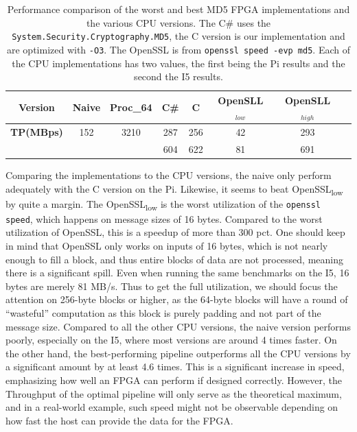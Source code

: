 \documentclass[a4paper, openany]{memoir}
\begin{document}
\begin{abstact}
\begin{table}[!htb]
\centering
\captionsetup{width=.8\linewidth}
\begin{tabular}{c c c c c c c c}
\hline
\textbf{Version} & Naive & Proc_{64} & C\# & C & OpenSLL$_{low}$ & OpenSLL$_{high}$\\
\hline
\textbf{TP(MBps)} & 152 & 3210 & 287 & 256 & 42 & 293\\
 & & & 604 & 622 & 81 & 691
\end{tabular}
\caption[MD5: FPGA and CPU comparisons]%
{Performance comparison of the worst and best MD5 FPGA implementations and the various CPU versions. The C\# uses the \texttt{System.Security.Cryptography.MD5}, the C version is our implementation and are optimized with \texttt{-O3}. The OpenSSL is from \texttt{openssl speed -evp md5}. Each of the CPU implementations has two values, the first being the Pi results and the second the I5 results.}
\label{tab:MD5compare}
\end{table}
Comparing the implementations to the CPU versions, the naive only perform adequately with the C version on the Pi. Likewise, it seems to beat OpenSSL\textsubscript{low} by quite a margin. The OpenSSL\textsubscript{low} is the worst utilization of the \texttt{openssl speed}, which happens on message sizes of 16 bytes. Compared to the worst utilization of OpenSSL, this is a speedup of more than 300 pct. One should keep in mind that OpenSSL only works on inputs of 16 bytes, which is not nearly enough to fill a block, and thus entire blocks of data are not processed, meaning there is a significant spill. Even when running the same benchmarks on the I5, 16 bytes are merely 81 MB/s. Thus to get the full utilization, we should focus the attention on 256-byte blocks or higher, as the 64-byte blocks will have a round of ``wasteful'' computation as this block is purely padding and not part of the message size.
Compared to all the other CPU versions, the naive version performs poorly, especially on the I5, where most versions are around 4 times faster. On the other hand, the best-performing pipeline outperforms all the CPU versions by a significant amount by at least 4.6 times. This is a significant increase in speed, emphasizing how well an FPGA can perform if designed correctly. However, the Throughput of the optimal pipeline will only serve as the theoretical maximum, and in a real-world example, such speed might not be observable depending on how fast the host can provide the data for the FPGA.

\end{abstact}
\end{document}
